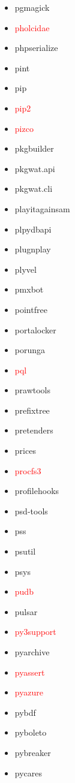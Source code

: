 \documentclass{l4proj}
\begin{document}
\begin{appendices}
{\begin{itemize}
\item pgmagick
\item\textcolor{red}{pholcidae}
\item phpserialize
\item pint
\item pip
\item\textcolor{red}{pip2}
\end{itemize}
}%
\noindent\parbox[t]{0.32\textwidth}{\raggedright%
\begin{itemize}
\item\textcolor{red}{pizco}
\item pkgbuilder
\item pkgwat.api
\item pkgwat.cli
\item playitagainsam
\item plpydbapi
\item plugnplay
\item plyvel
\item pmxbot
\item pointfree
\item portalocker
\item porunga
\item\textcolor{red}{pql}
\item prawtools
\item prefixtree
\item pretenders
\item prices
\item\textcolor{red}{procfs3}
\item profilehooks
\item psd-tools
\item pss
\item psutil
\item psys
\item\textcolor{red}{pudb}
\item pulsar
\item\textcolor{red}{py3support}
\item pyarchive
\item\textcolor{red}{pyassert}
\item\textcolor{red}{pyazure}
\item pybdf
\end{itemize}
}%
\noindent\parbox[t]{0.32\textwidth}{\raggedright%
\begin{itemize}
\item pyboleto
\item pybreaker
\item pycares

\end{itemize}}
\end{appendices}
\end{document}
